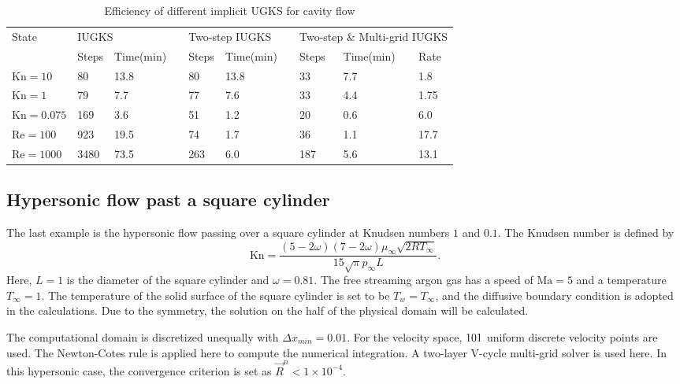 \documentclass[3p,12pt]{elsarticle}
\begin{document}
	
	\begin{table}
		\caption{Efficiency of different implicit UGKS for cavity flow}
		\begin{tabular}{llllllllll}
			\hline
			\multirow{2}{*}{State} & \multicolumn{2}{l}{IUGKS} &  & \multicolumn{2}{l}{Two-step IUGKS} &  & \multicolumn{3}{l}{Two-step $\&$ Multi-grid IUGKS} \\ \cline{2-10}
			& Steps & Time(min) &  & Steps & Time(min) &  & Steps & Time(min) & Rate \\ \hline
			$\mathrm{Kn} = 10$    & 80    & 13.8      &  & 80    & 13.8      &  & 33    & 7.7       & 1.8  \\
			$\mathrm{Kn} = 1$     & 79    & 7.7       &  & 77    & 7.6       &  & 33    & 4.4      & 1.75  \\
			$\mathrm{Kn} = 0.075$ & 169   & 3.6         &  & 51   & 1.2       &  & 20    & 0.6       & 6.0  \\
			$\mathrm{Re} = 100$   & 923   & 19.5      &  & 74   & 1.7       &  & 36    & 1.1       & 17.7  \\
			$\mathrm{Re} = 1000$ & 3480  & 73.5      &  & 263  & 6.0      &  & 187   & 5.6      & 13.1  \\ \hline
		\end{tabular}
		\label{cavityeff}
	\end{table}
	
	\subsection{Hypersonic flow past a square cylinder}
	The last example is the hypersonic flow passing over a square cylinder at Knudsen numbers $1$ and $0.1$. The Knudsen number is defined by
	\begin{equation}
		\mathrm{Kn} = \frac{(5 - 2\omega)(7-2\omega)\mu_{\infty} \sqrt{2R T_{\infty}}}{15\sqrt{\pi}p_{\infty} L}.
	\end{equation}
	Here, $L = 1$ is the diameter of the square cylinder and $\omega = 0.81$.
	The free streaming argon gas has a speed of $\mathrm{Ma} = 5$ and a temperature $T_{\infty} = 1$. The temperature of the solid surface of the square cylinder is set to be $T_w = T_{\infty}$, and the diffusive boundary condition is adopted in the calculations. Due to the symmetry, the solution on the half of the physical domain will be calculated.
	
	The computational domain is discretized unequally with $\Delta x_{min} = 0.01$. For the velocity space, $101 \time 101$ uniform discrete velocity points are used. The Newton-Cotes rule is applied here to compute the numerical integration. A two-layer V-cycle multi-grid solver is used here. In this hypersonic case, the convergence criterion is set as $\vec{R}^n < 1 \times 10^{-4}$.
	
\end{document}
